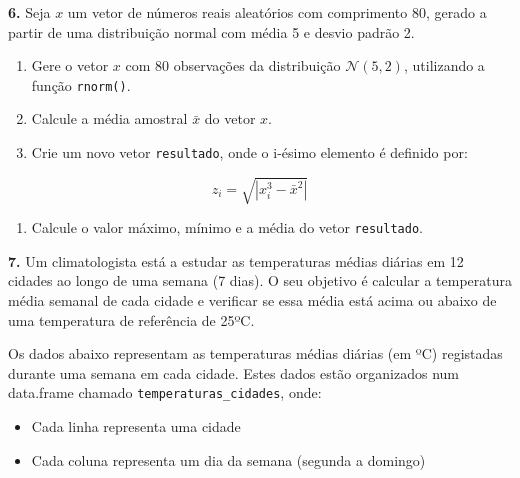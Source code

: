 \documentclass[
]{book}
\providecommand{\tightlist}{%
  \setlength{\itemsep}{0pt}\setlength{\parskip}{0pt}}
\begin{document}
\textbf{6.} Seja \(x\) um vetor de números reais aleatórios com comprimento 80, gerado a partir de uma distribuição normal com média 5 e desvio padrão 2.

\begin{enumerate}
\def\labelenumi{(\alph{enumi})}
\item
  Gere o vetor \(x\) com 80 observações da distribuição \(\mathcal{N}(5, 2)\), utilizando a função \texttt{rnorm()}.
\item
  Calcule a média amostral \(\bar{x}\) do vetor \(x\).
\item
  Crie um novo vetor \texttt{resultado}, onde o i-ésimo elemento é definido por:
\end{enumerate}

\[z_i = \sqrt{ \left| x_i^3 - \bar{x}^2 \right| }\]

\begin{enumerate}
\def\labelenumi{(\alph{enumi})}
\setcounter{enumi}{3}
\tightlist
\item
  Calcule o valor máximo, mínimo e a média do vetor \texttt{resultado}.
\end{enumerate}

\textbf{7.} Um climatologista está a estudar as temperaturas médias diárias em 12 cidades ao longo de uma semana (7 dias). O seu objetivo é calcular a temperatura média semanal de cada cidade e verificar se essa média está acima ou abaixo de uma temperatura de referência de 25ºC.

Os dados abaixo representam as temperaturas médias diárias (em ºC) registadas durante uma semana em cada cidade. Estes dados estão organizados num data.frame chamado \texttt{temperaturas\_cidades}, onde:

\begin{itemize}
\tightlist
\item
  Cada linha representa uma cidade
\item
  Cada coluna representa um dia da semana (segunda a domingo)
\end{itemize}
\end{document}
